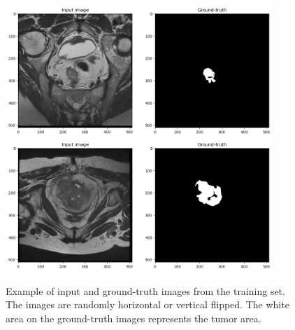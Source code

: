 \documentclass{standalone}
\begin{document}
\begin{figure}[htp]

    \centering
    \includegraphics[width=0.9\textwidth]{../images/showdataset.png}
    \includegraphics[width=0.9\textwidth]{../images/showdataset1.png}

    \caption{Example of input and ground-truth images from the training set. The images are randomly horizontal or vertical flipped. 
    The white area on the ground-truth images represents the tumor area.}
    \label{showdataset}
    
    \end{figure}
\end{document}
